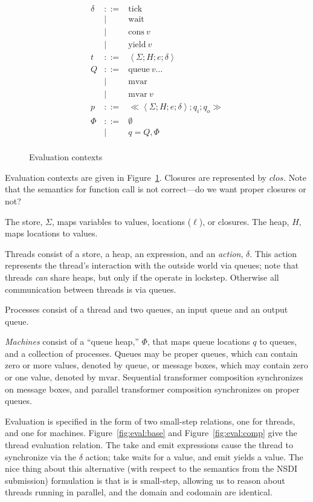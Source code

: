 \documentclass[twocolumn]{article}
\newcommand{\bnfdef}{::=}
\newcommand{\bnfalt}{\mathrel{\mid}}
\newcommand{\kw}[1]{\mbox{#1}}
\newcommand{\thread}[4]{\left<#1; #2; #3; #4\right>}
\newcommand{\proc}[3]{\ll\!#1; #2; #3\!\gg}
\begin{document}
\begin{figure}
\begin{equation*}
\begin{array}{lcl}
  \delta
     & \bnfdef & \kw{tick} \\
     & \bnfalt & \kw{wait} \\
     & \bnfalt & \kw{cons}~ v \\
     & \bnfalt & \kw{yield}~ v \\
  t
     & \bnfdef & \thread{\Sigma}{H}{e}{\delta} \\
  Q
     & \bnfdef & \kw{queue}~ v \ldots \\
     & \bnfalt & \kw{mvar} \\
     & \bnfalt & \kw{mvar}~ v \\
  p
     & \bnfdef & \proc{\thread{\Sigma}{H}{e}{\delta}}{q_i}{q_o} \\
  \Phi
     & \bnfdef & \emptyset \\
     & \bnfalt & q = Q, \Phi \\
\end{array}
\end{equation*}
\caption{Evaluation contexts}
\label{fig:lang:context}
\end{figure}

Evaluation contexts are given in Figure~\ref{fig:lang:context}. Closures are
represented by $clos$. Note that the semantics for function call is not
correct---do we want proper closures or not?

The store, $\Sigma$, maps variables to values, locations ($\ell$), or
closures. The heap, $H$, maps locations to values.

Threads consist of a store, a heap, an expression, and an \emph{action},
$\delta$. This action represents the thread's interaction with the outside world
via queues; note that threads \emph{can} share heaps, but only if the operate in
lockstep. Otherwise all communication between threads is via queues.

Processes consist of a thread and two queues, an input queue and an output
queue.

\emph{Machines} consist of a ``queue heap,'' $\Phi$, that maps queue locations
$q$ to queues, and a collection of processes. Queues may be proper queues, which
can contain zero or more values, denoted by $\kw{queue}$, or message boxes,
which may contain zero or one value, denoted by $\kw{mvar}$. Sequential
transformer composition synchronizes on message boxes, and parallel transformer
composition synchronizes on proper queues.

Evaluation is specified in the form of two small-step relations, one for
threads, and one for machines. Figure~\ref{fig:eval:base} and
Figure~\ref{fig:eval:comp} give the thread evaluation relation. The $\kw{take}$
and $\kw{emit}$ expressions cause the thread to synchronize via the $\delta$
action; $\kw{take}$ waits for a value, and $\kw{emit}$ yields a value. The nice
thing about this alternative (with respect to the semantics from the NSDI
submission) formulation is that is is small-step, allowing us to reason about
threads running in parallel, and the domain and codomain are identical.
\end{document}
